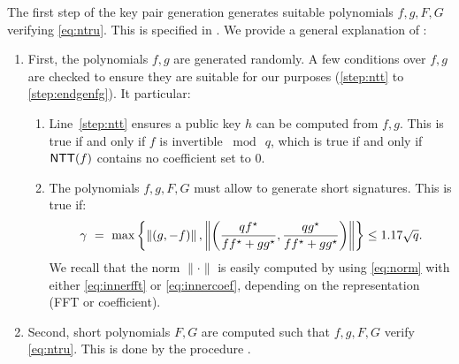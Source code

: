 The first step of the key pair generation generates suitable polynomials $f,g,F,G$ verifying \eqref{eq:ntru}. This is specified in \longntrugen. We provide a general explanation of \ntrugen:
\begin{enumerate}
 \item First, the polynomials $f,g$ are generated randomly. A few conditions over $f,g$ are checked to ensure they are suitable for our purposes (\cref{step:ntt} to \cref{step:endgenfg}). It particular:
 \begin{enumerate}
  \item Line~\ref{step:ntt} ensures a public key $h$ can be computed from $f,g$. This is true if and only if $f$ is invertible $\bmod\ q$, which is true if and only if $\textsf{NTT}(f)$ contains no coefficient set to $0$.
  \item The polynomials $f,g,F,G$ must allow to generate short signatures. This is true if:
  \begin{equation}
  \gamma~=~\max \left\{ \left\|(g,-f)\right\|,  \left\|\left(\frac{qf^\star}{ff^\star + gg^\star},\frac{qg^\star}{ff^\star + gg^\star}\right)\right\| \right\} \leq 1.17\sqrt{q}.
  \end{equation}
  We recall that the norm $\|\cdot\|$ is easily computed by using \eqref{eq:norm} with either \eqref{eq:innerfft} or \eqref{eq:innercoef}, depending on the representation (FFT or coefficient).
 \end{enumerate}
 \item Second, short polynomials $F,G$ are computed such that $f,g,F,G$ verify \eqref{eq:ntru}. This is done by the procedure \longntrusolve.
 \end{enumerate}

